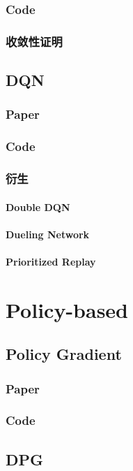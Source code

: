 \documentclass{book}
\begin{document}
\subsection{Code}
\subsection{收敛性证明}
\section{DQN}
\subsection{Paper}
\subsection{Code}
\subsection{衍生}
\subsubsection{Double DQN}
\subsubsection{Dueling Network}
\subsubsection{Prioritized Replay}
\chapter{Policy-based}
\section{Policy Gradient}
\subsection{Paper}
\subsection{Code}
\section{DPG}
\end{document}
